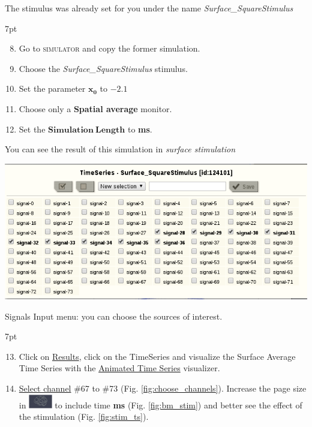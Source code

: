 \documentclass{tufte-handout}
\newenvironment{simulation}{%
  \def\FrameCommand{%
    \hspace{1pt}%
    {\color{ForestGreen}\vrule width 2pt}%
    {\color{simulationshade}\vrule width 4pt}%
    \colorbox{simulationshade}%
  }%
  \MakeFramed{\advance\hsize-\width\FrameRestore}%
  \noindent\hspace{-4.55pt}%
  \begin{adjustwidth}{}{7pt}%
  \vspace{2pt}\vspace{2pt}%
}
{%
  \vspace{2pt}\end{adjustwidth}\endMakeFramed%
}
\begin{document}
The stimulus was already set for you under the name \textit{Surface\_SquareStimulus}

  \begin{simulation}
  \begin{enumerate}
  \setcounter{enumi}{7}
  \item Go to \textsc{simulator} and copy the former simulation.
  \item Choose the \textit{Surface\_SquareStimulus} stimulus.
  \item Set the parameter $\mathbf{x_0}$ to $\mathbf{-2.1}$
  \item Choose only a \textbf{Spatial average} monitor.
  \item Set the $\mathbf{Simulation\:Length}$ to \textbf{\unit[4000]{ms}}.
 
\end{enumerate}
\end{simulation}


You can see the result of this simulation in \textit{surface stimulation}

\begin{marginfigure}
  \includegraphics[width=\linewidth]{Handout_UI_ModellingAnEpilepticPatient_ChooseChannelsStimulation}%
  \caption{Signals Input menu: you can choose the sources of interest.}%
  \label{fig:choose_channels}%
\end{marginfigure}


  \begin{simulation}
  \begin{enumerate}
  \setcounter{enumi}{12}
  \item Click on \underline{Results}, click on the TimeSeries and visualize the Surface Average Time Series with 
  the \underline{Animated Time Series} visualizer.
  \item \underline{Select channel} \#67 to \#73 (Fig. \ref{fig:choose_channels}). Increase the page size in \includegraphics[width=0.08\textwidth]{butt_brain_menu} to include time \textbf{\unit[2000]{ms}}
  (Fig. \ref{fig:bm_stim}) and better see the effect of the stimulation (Fig. \ref{fig:stim_ts}).
 
\end{enumerate}
\end{simulation}
\end{document}

